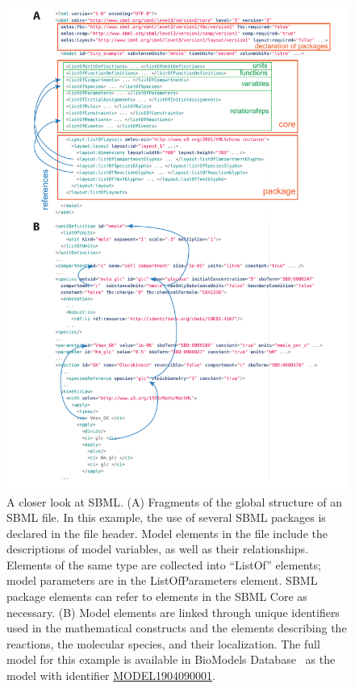 \documentclass{sbml-paper}
\begin{document}
\begin{figure}[p]
  \center
  \includegraphics[width=.9\textwidth]{resources/SBML_XML_example_v03.pdf}
  \caption{A closer look at SBML. (A) Fragments of the global structure of an SBML file. In this example, the use of several SBML packages is declared in the file header. Model elements in the file include the descriptions of model variables, as well as their relationships.  Elements of the same type are collected into ``ListOf'' elements; \eg model parameters are in the ListOfParameters element. SBML package elements can refer to elements in the SBML Core as necessary. (B) Model elements are linked through unique identifiers used in the mathematical constructs and the elements describing the reactions, the molecular species, and their localization. The full model for this example is available in BioModels Database~\citep{Malik-Sheriff2020biomodels} as the model with identifier \href{https://identifiers.org/biomodels.db:MODEL1904090001}{MODEL1904090001}.}
\label{fig:examples-sbml}
\end{figure}
\end{document}
